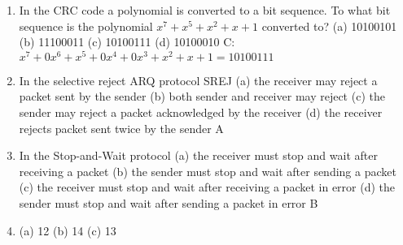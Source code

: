 \documentclass{article}
\begin{document}
\begin{enumerate}
            (b) 10
            \newline
            (c) 6
            \newline
            (d) 8
            \newline
            C: (Take XOR) 1001111001 = 6
        \item In the CRC code a polynomial is converted to a bit sequence. To what bit sequence is the polynomial $x^7 + x^5 + x^2 + x +1$ converted to?
            \newline
            (a) 10100101
            \newline
            (b) 11100011
            \newline
            (c) 10100111
            \newline
            (d) 10100010
            \newline
            C: $x^7 + 0x^6 + x^5 + 0x^4 + 0x^3 + x^2 + x + 1 = 10100111$
        \item In the selective reject ARQ protocol SREJ
            \newline
            (a) the receiver may reject a packet sent by the sender
            \newline
            (b) both sender and receiver may reject
            \newline
            (c) the sender may reject a packet acknowledged by the receiver
            \newline
            (d) the receiver rejects packet sent twice by the sender
            \newline
            A
        \item In the Stop-and-Wait protocol
            \newline
            (a) the receiver must stop and wait after receiving a packet
            \newline
            (b) the sender must stop and wait after sending a packet
            \newline
            (c) the receiver must stop and wait after receiving a packet in error
            \newline
            (d) the sender must stop and wait after sending a packet in error
            \newline
            B
        \item (a) 12
            \newline
            (b) 14
            \newline
            (c) 13
            \newline

\end{enumerate}
\end{document}
